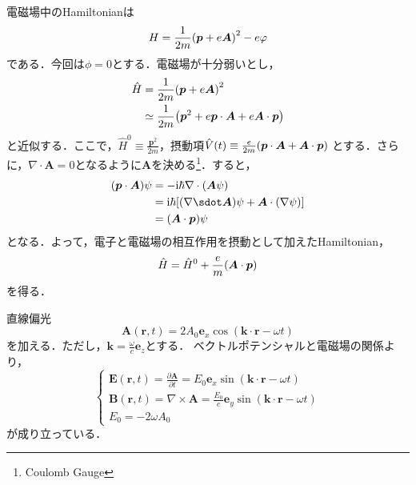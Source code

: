\documentclass{report}
\begin{document}
  電磁場中のHamiltonianは
  \begin{equation}
    H=\frac{1}{2m}\qty(\bm{p} + e\bm{A})^2 - e\varphi
  \end{equation}
  である．今回は$\phi=0$とする．電磁場が十分弱いとし，
  \begin{align}
    \hat{H} &= \frac{1}{2m}\qty(\bm{p}+e\bm{A})^2\\
    &\simeq \frac{1}{2m}\qty(\bm{p}^2+e\bm{p}\cdot\bm{A} + e\bm{A} \cdot \bm{p})\\
  \end{align}
  と近似する．ここで，$\hat{H}^0 \equiv \frac{\bm{p}^2}{2m}$，摂動項$\hat{V}(t) \equiv \frac{e}{2m} \qty(\bm{p}\cdot\bm{A} + \bm{A} \cdot \bm{p})$
  とする．さらに，$\nabla\cdot\bm{A}=0$となるように$\bm{A}$を決める\footnote{Coulomb Gauge}．すると，
  \begin{align}
    \qty(\bm{p} \cdot \bm{A})\psi &= -\i\hbar \nabla \cdot \qty(\bm{A} \psi)\\
    &= \i\hbar\qty[\qty(\nabla \sdot \bm{A}) \psi + \bm{A} \cdot \qty(\nabla \psi)]\\
    &= \qty(\bm{A} \cdot \bm{p}) \psi
  \end{align}
  となる．よって，電子と電磁場の相互作用を摂動として加えたHamiltonian，
  \begin{equation}
    \hat{H} = \hat{H}^0 + \frac{e}{m}\qty(\bm{A} \cdot \bm{p})
  \end{equation}
  を得る．
  \begin{myex}{直線偏光}{}
    \begin{equation}
      \bm{A}(\bm{r},t) = 2A_0 \bm{e}_x \cos(\bm{k} \cdot \bm{r} - \omega t)
    \end{equation}
    を加える．ただし，$\bm{k} = \frac{\omega}{c}\bm{e}_z$とする．
    ベクトルポテンシャルと電磁場の関係より，
    \begin{equation}
      \begin{cases}
      \bm{E}(\bm{r},t) = \frac{\partial \bm{A}}{\partial t} = E_0 \bm{e}_x \sin(\bm{k} \cdot \bm{r} - \omega t)\\
      \bm{B}(\bm{r},t) = \nabla \times \bm{A} = \frac{E_0}{c}\bm{e}_y \sin(\bm{k} \cdot \bm{r} - \omega t)\\
      E_0 = -2 \omega A_0
      \end{cases}
    \end{equation}
    が成り立っている．
  \end{myex}
\end{document}
